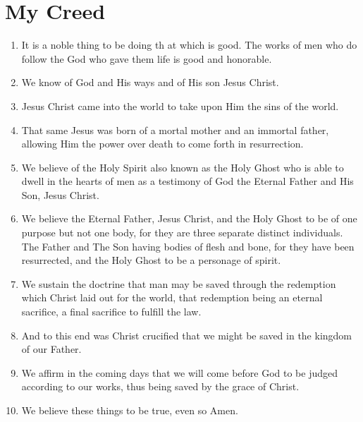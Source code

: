 \chapter{My Creed}
\begin{enumerate}
\item It is a noble thing to be doing th at which is good. 
The works of men who do follow the God who gave them life is good 
and honorable.

\item We know of God and His ways and of His son Jesus Christ.

\item Jesus Christ came into the world to take upon Him the sins of the world.

\item  That same Jesus was born of a mortal mother and an immortal father, 
allowing Him the power over death to come forth in resurrection.

\item We believe of the Holy Spirit also known as the Holy Ghost who is 
able to dwell in the hearts of men as a testimony of God the Eternal Father 
and His Son, Jesus Christ.

\item We believe the Eternal Father, Jesus Christ, and the Holy Ghost to be of 
one purpose but not one body, for they are three separate distinct individuals. 
The Father and The Son having bodies of flesh and bone, for they have been 
resurrected, and the Holy Ghost to be a personage of spirit.

\item We sustain the doctrine that man may be saved through the redemption 
which Christ laid out for the world, that redemption being an eternal sacrifice, 
a final sacrifice to fulfill the law.

\item And to this end was Christ crucified that we might be saved in the 
kingdom of our Father.

\item We affirm in the coming days that we will come before God to be 
judged according to our works, thus being saved by the grace of Christ.

\item We believe these things to be true, even so Amen.
\end{enumerate}